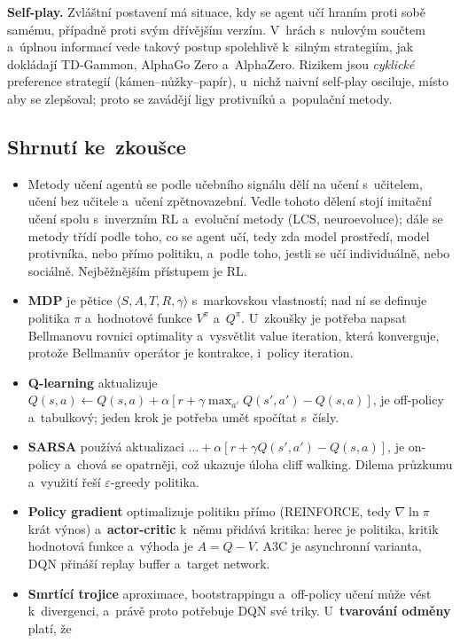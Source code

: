 \documentclass[11pt,a4paper]{article}
\theoremstyle{definition}
\begin{document}
\textbf{Self-play.} Zvláštní postavení má situace, kdy se agent učí hraním proti sobě samému,
případně proti svým dřívějším verzím. V~hrách s~nulovým součtem a~úplnou informací vede takový
postup spolehlivě k~silným strategiím, jak dokládají TD-Gammon, AlphaGo Zero a~AlphaZero.
Rizikem jsou \emph{cyklické} preference strategií (kámen--nůžky--papír), u~nichž naivní
self-play osciluje, místo aby se zlepšoval; proto se zavádějí ligy protivníků a~populační
metody.

\subsection{Shrnutí ke~zkoušce}

\begin{itemize}
\item Metody učení agentů se podle učebního signálu dělí na učení s~učitelem, učení bez učitele
  a~učení zpětnovazební. Vedle tohoto dělení stojí imitační učení spolu s~inverzním RL
  a~evoluční metody (LCS, neuroevoluce); dále se metody třídí podle toho, co se agent učí, tedy
  zda model prostředí, model protivníka, nebo přímo politiku, a~podle toho, jestli se učí
  individuálně, nebo sociálně. Nejběžnějším přístupem je RL.
\item \textbf{MDP} je pětice $\langle S,A,T,R,\gamma\rangle$ s~markovskou vlastností; nad ní se
  definuje politika $\pi$ a~hodnotové funkce $V^\pi$ a~$Q^\pi$. U~zkoušky je potřeba napsat
  Bellmanovu rovnici optimality a~vysvětlit value iteration, která konverguje, protože
  Bellmanův operátor je kontrakce, i~policy iteration.
\item \textbf{Q-learning} aktualizuje
  $Q(s,a) \leftarrow Q(s,a) + \alpha[r + \gamma\max_{a'}Q(s',a') - Q(s,a)]$, je off-policy
  a~tabulkový; jeden krok je potřeba umět spočítat s~čísly.
\item \textbf{SARSA} používá aktualizaci $\dots + \alpha[r + \gamma Q(s',a') - Q(s,a)]$, je
  on-policy a~chová se opatrněji, což ukazuje úloha cliff walking. Dilema průzkumu a~využití
  řeší $\varepsilon$-greedy politika.
\item \textbf{Policy gradient} optimalizuje politiku přímo (REINFORCE, tedy $\nabla \ln \pi$
  krát výnos) a~\textbf{actor-critic} k~němu přidává kritika: herec je politika, kritik
  hodnotová funkce a~výhoda je $A = Q - V$. A3C je asynchronní varianta, DQN přináší replay
  buffer a~target network.
\item \textbf{Smrtící trojice} aproximace, bootstrappingu a~off-policy učení může vést
  k~divergenci, a~právě proto potřebuje DQN své triky. U~\textbf{tvarování odměny} platí, že

\end{itemize}
\end{document}
